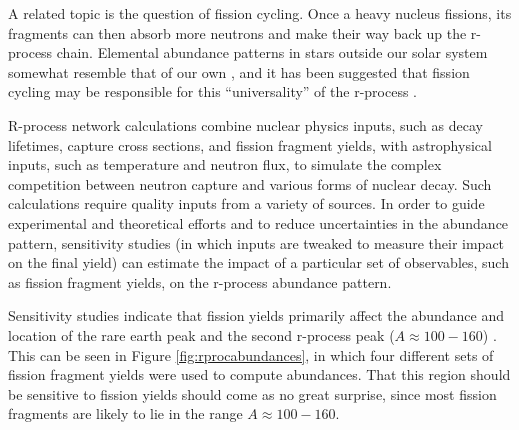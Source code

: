 A related topic is the question of fission cycling. Once a heavy nucleus fissions, its fragments can then absorb more neutrons and make their way back up the r-process chain. Elemental abundance patterns in stars outside our solar system somewhat resemble that of our own \cite{Arnould2007}, and it has been suggested that fission cycling may be responsible for this ``universality'' of the r-process \cite{Beun2008}. %

R-process network calculations combine nuclear physics inputs, such as decay lifetimes, capture cross sections, and fission fragment yields, with astrophysical inputs, such as temperature and neutron flux, to simulate the complex competition between neutron capture and various forms of nuclear decay. Such calculations require quality inputs from a variety of sources. In order to guide experimental and theoretical efforts and to reduce uncertainties in the abundance pattern, sensitivity studies (in which inputs are tweaked to measure their impact on the final yield) can estimate the impact of a particular set of observables, such as fission fragment yields, on the r-process abundance pattern.

Sensitivity studies indicate that fission yields primarily affect the abundance and location of the rare earth peak and the second r-process peak ($A\approx100-160$) \cite{Goriely2015a, Eichler2015}. This can be seen in Figure \ref{fig:rprocabundances}, in which four different sets of fission fragment yields were used to compute abundances. That this region should be sensitive to fission yields should come as no great surprise, since most fission fragments are likely to lie in the range $A\approx100-160$.

